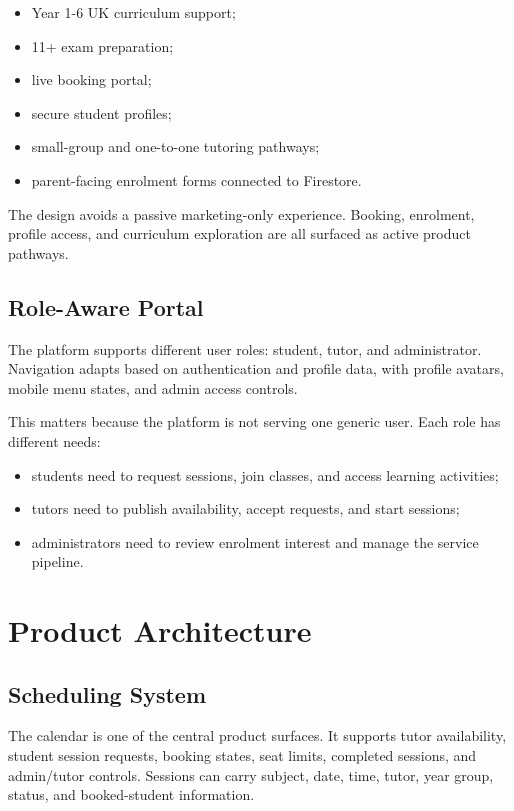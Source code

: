 \documentclass[11pt,a4paper]{article}
\begin{document}
\begin{itemize}
    \item Year 1-6 UK curriculum support;
    \item 11+ exam preparation;
    \item live booking portal;
    \item secure student profiles;
    \item small-group and one-to-one tutoring pathways;
    \item parent-facing enrolment forms connected to Firestore.
\end{itemize}

The design avoids a passive marketing-only experience. Booking, enrolment, profile access, and curriculum exploration are all surfaced as active product pathways.

\subsection{Role-Aware Portal}

The platform supports different user roles: student, tutor, and administrator. Navigation adapts based on authentication and profile data, with profile avatars, mobile menu states, and admin access controls.

This matters because the platform is not serving one generic user. Each role has different needs:

\begin{itemize}
    \item students need to request sessions, join classes, and access learning activities;
    \item tutors need to publish availability, accept requests, and start sessions;
    \item administrators need to review enrolment interest and manage the service pipeline.
\end{itemize}

\section{Product Architecture}

\subsection{Scheduling System}

The calendar is one of the central product surfaces. It supports tutor availability, student session requests, booking states, seat limits, completed sessions, and admin/tutor controls. Sessions can carry subject, date, time, tutor, year group, status, and booked-student information.
\end{document}
